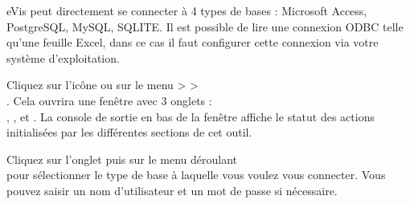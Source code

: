 eVis peut directement se connecter à 4 types de bases : Microsoft Access, PostgreSQL, MySQL, SQLITE. Il est possible de lire une connexion ODBC telle qu'une feuille Excel, dans ce cas il faut configurer cette connexion via votre système d'exploitation.

\label{evis_launch_database}


Cliquez sur l'icône  ou sur le menu  >  >\\ . Cela ouvrira une fenêtre avec 3 onglets :\\ , , et . La console de sortie en bas de la fenêtre affiche le statut des actions initialisées par les différentes sections de cet outil.

\label{evis_connect_database}


Cliquez sur l'onglet  puis sur le menu déroulant\\  pour sélectionner le type de base à laquelle vous voulez vous connecter. Vous pouvez saisir un nom d'utilisateur et un mot de passe si nécessaire.


